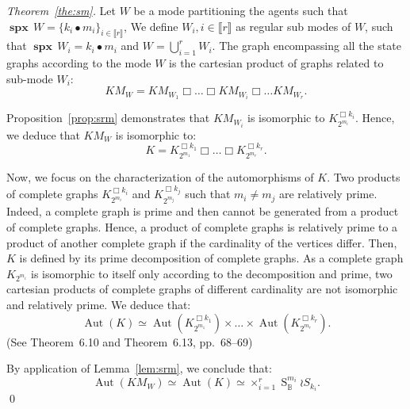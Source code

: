 \documentclass[12pt]{elsarticle}
\newcommand{\Bset}[0]{\mathbb{B}}
\newcommand{\spectrum}[0]{{\operatorname{\textbf{spx}}\,}}
\newcommand{\gsym}[1]{\operatorname{S}_{#1}}
\newcommand{\aut}[0]{\operatorname{Aut}}
\begin{document}
\begin{proof}[Theorem~\ref{the:sm}]

Let $W$ be a mode partitioning the agents such that $\spectrum W = \{k_i \bullet m_i\}_{i \in \llbracket r \rrbracket}$, We define $W_i, i \in \llbracket r \rrbracket$ as regular sub modes of $W$, such that $\spectrum W_i = k_i \bullet m_i$ and $W = \bigcup_{i=1}^r W_i$. 
The graph encompassing all the state graphs according to the mode $W$ is the cartesian product of graphs related to sub-mode $W_i$:
$$KM_W= KM_{W_1} \Box \ldots \Box KM_{W_i} \Box \ldots KM_{W_r}.$$

\medskip 
\noindent
Proposition~\ref{prop:srm} demonstrates that $KM_{W_i}$ is isomorphic to $K_{2^{m_i}}^{\Box k_i}$. Hence, we deduce that $KM_W$ is isomorphic to:
 $$K = K_{2^{m_1}}^{\Box k_1} \Box \ldots \Box K_{2^{m_r}}^{\Box k_r}.$$ 

\medskip
\noindent
Now, we focus on the characterization of the automorphisms of $K$.
Two products of complete graphs $K_{2^{m_i}}^{\Box k_i}$ and $K_{2^{m_j}}^{\Box k_j}$ such that $m_i \neq m_j$ are relatively prime. Indeed, a complete graph is prime and then cannot be generated from a product of complete graphs. Hence, a product of complete graphs is relatively prime to a product of another complete graph if the cardinality of the vertices differ. Then, $K$ is defined by its prime decomposition of complete graphs. As a complete graph $K_{2^{m_i}}$ is isomorphic to itself only according to the decomposition and prime, two cartesian products of complete graphs of different cardinality are not isomorphic and relatively prime. We deduce that: 
$$ \aut(K) \simeq \aut(K_{2^{m_1}}^{\Box k_1}) \times \ldots \times \aut(K_{2^{m_r}}^{\Box k_r}).$$
(See \cite{Hammack2011} Theorem~6.10 and Theorem~6.13, pp.~68--69)
 
\medskip
\noindent
By application of Lemma~\ref{lem:srm}, we conclude that:
$$\aut(KM_W) \simeq \aut(K) \simeq \times_{i=1}^{r} \gsym \Bset^{m_i} \wr S_{k_i}.$$
\qed \end{proof}
\end{document}
